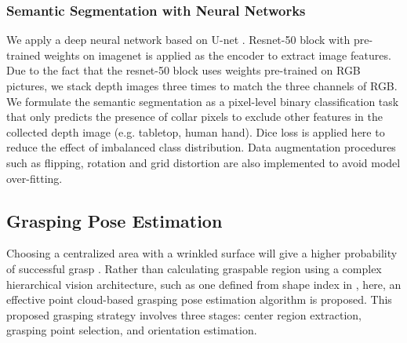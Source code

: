 \documentclass[letterpaper, 10 pt, conference]{ieeeconf}  %
\begin{document}
\subsubsection{Semantic Segmentation with Neural Networks}
We apply a deep neural network based on U-net \cite{ronneberger2015u}. Resnet-50 block \cite{he2016deep} with pre-trained weights on imagenet\cite{deng2009imagenet} is applied as the encoder to extract image features. Due to the fact that the resnet-50 block uses weights pre-trained on RGB pictures, we stack depth images three times to match the three channels of RGB. We formulate the semantic segmentation as a pixel-level binary classification task that only predicts the presence of collar pixels to exclude other features in the collected depth image (e.g. tabletop, human hand).
Dice loss is applied here to reduce the effect of imbalanced class distribution. Data augmentation procedures such as flipping, rotation and grid distortion are also implemented to avoid model over-fitting.

\subsection{Grasping Pose Estimation}
Choosing a centralized area with a wrinkled surface will give a higher probability of successful grasp \cite{jimenez2020perception}. Rather than calculating graspable region using a complex hierarchical vision architecture, such as one defined from shape index in \cite{sun2015accurate}, here, an effective point cloud-based grasping pose estimation algorithm is proposed. This proposed grasping strategy involves three stages: center region extraction, grasping point selection, and orientation estimation. 
\end{document}
